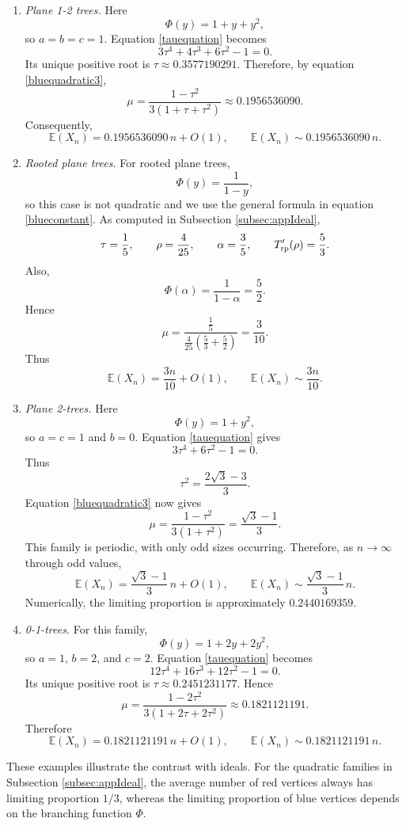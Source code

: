 \documentclass[10pt,a4paper]{amsart}
\theoremstyle{remark}
\begin{document}
\begin{enumerate}

\item \emph{Plane 1-2 trees.}
Here
\[
\Phi(y)=1+y+y^2,
\]
so $a=b=c=1$.  Equation \eqref{tauequation} becomes
\[
3\tau^4+4\tau^3+6\tau^2-1=0.
\]
Its unique positive root is
$
\tau\approx 0.3577190291.
$
Therefore, by equation \eqref{bluequadratic3},
\[
\mu
=
\frac{1-\tau^2}{3(1+\tau+\tau^2)}
\approx 0.1956536090.
\]
Consequently,
\[
\mathbb E(X_n)
=
0.1956536090\,n+O(1),
\qquad
\mathbb E(X_n)\sim 0.1956536090\,n.
\]

\item \emph{Rooted plane trees.}
For rooted plane trees,
\[
\Phi(y)=\frac{1}{1-y},
\]
so this case is not quadratic and we use the general formula in equation
\eqref{blueconstant}.  As computed in Subsection \ref{subsec:appIdeal},
\[
\tau=\frac15,
\qquad
\rho=\frac4{25},
\qquad
\alpha=\frac35,
\qquad
T_{\rm rp}'(\rho)=\frac53.
\]
Also,
\[
\Phi(\alpha)=\frac{1}{1-\alpha}=\frac52.
\]
Hence
\[
\mu
=
\frac{\frac15}
{\frac4{25}\left(\frac53+\frac52\right)}
=
\frac3{10}.
\]
Thus
\[
\mathbb E(X_n)=\frac{3n}{10}+O(1),
\qquad
\mathbb E(X_n)\sim\frac{3n}{10}.
\]

\item \emph{Plane 2-trees.}
Here
\[
\Phi(y)=1+y^2,
\]
so $a=c=1$ and $b=0$.  Equation \eqref{tauequation} gives
\[
3\tau^4+6\tau^2-1=0.
\]
Thus
\[
\tau^2=\frac{2\sqrt3-3}{3}.
\]
Equation \eqref{bluequadratic3} now gives
\[
\mu
=
\frac{1-\tau^2}{3(1+\tau^2)}
=
\frac{\sqrt3-1}{3}.
\]
This family is periodic, with only odd sizes occurring.  Therefore, as
$n\to\infty$ through odd values,
\[
\mathbb E(X_n)
=
\frac{\sqrt3-1}{3}\,n+O(1),
\qquad
\mathbb E(X_n)
\sim
\frac{\sqrt3-1}{3}\,n.
\]
Numerically, the limiting proportion is approximately $0.2440169359$.

\item \emph{0-1-trees.}
For this family,
\[
\Phi(y)=1+2y+2y^2,
\]
so $a=1$, $b=2$, and $c=2$.  Equation \eqref{tauequation} becomes
\[
12\tau^4+16\tau^3+12\tau^2-1=0.
\]
Its unique positive root is
$
\tau\approx 0.2451231177.
$
Hence
\[
\mu
=
\frac{1-2\tau^2}{3(1+2\tau+2\tau^2)}
\approx 0.1821121191.
\]
Therefore
\[
\mathbb E(X_n)
=
0.1821121191\,n+O(1),
\qquad
\mathbb E(X_n)\sim 0.1821121191\,n.
\]

\end{enumerate}

These examples illustrate the contrast with ideals.  For the quadratic
families in Subsection \ref{subsec:appIdeal}, the average number of red vertices always has
limiting proportion $1/3$, whereas the limiting proportion of blue vertices
depends on the branching function $\Phi$.
\end{document}
